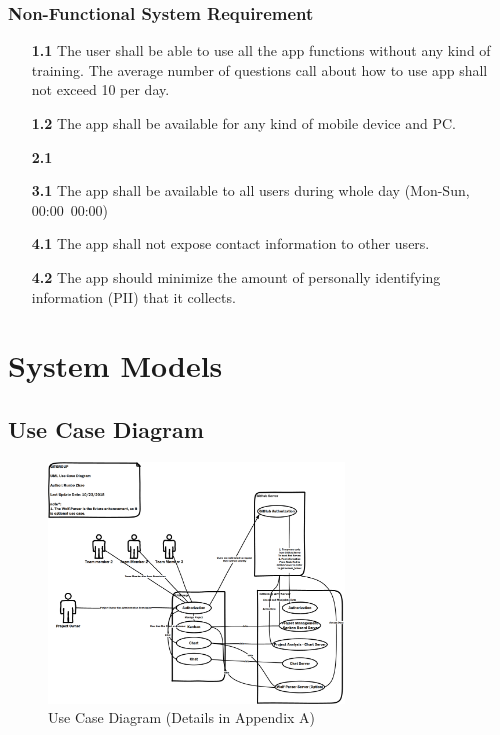 \documentclass[12pt,a4paper]{report}
\begin{document}
	\subsection{Non-Functional System Requirement}
		\begin{enumerate}
			\item[\textbf{1.1}] The user shall be able to use all the app functions without any kind of training. The average number of questions call about how to use app shall not exceed 10 per day.
			\item[\textbf{1.2}] The app shall be available for any kind of mobile device and PC.
			\item[\textbf{2.1}]
			\item[\textbf{3.1}] The app shall be available to all users during whole day (Mon-Sun, 00:00~00:00)
			\item[\textbf{4.1}] The app shall not expose contact information to other users. 
			\item[\textbf{4.2}] The app should minimize the amount of personally identifying information (PII) that it collects.
		\end{enumerate}
	

\chapter{System Models}
\section{Use Case Diagram}
\begin{figure}[H]
	\centering
	\includegraphics[width=0.7\textwidth]{./pics/UseCaseDiagram.png}
	\caption{Use Case Diagram (Details in Appendix A)}
\end{figure}
\end{document}
